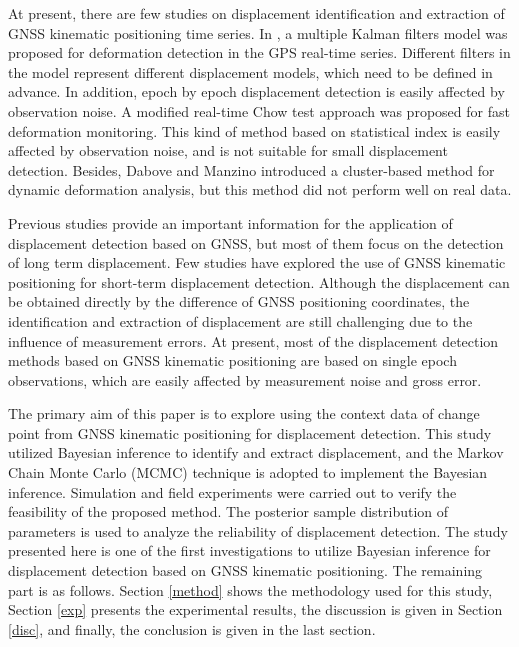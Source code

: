 \documentclass[final,3p,times]{elsarticle}
\begin{document}
	At present, there are few studies on displacement identification and extraction of GNSS kinematic positioning time series. In \cite{li2010deformation}, a multiple Kalman filters model was proposed for deformation detection in the GPS real-time series. Different filters in the model represent different displacement models, which need to be defined in advance. In addition, epoch by epoch displacement detection is easily affected by observation noise.
	A modified real-time Chow test approach was proposed for fast deformation monitoring\cite{bellone2016real}. This kind of method based on statistical index is easily affected by observation noise, and is not suitable for small displacement detection\cite{pirotti2015micro}. Besides, Dabove and Manzino\cite{dabove2016fast} introduced a cluster-based method for dynamic deformation analysis, but this method did not perform well on real data.
	
	Previous studies provide an important information for the application of displacement detection based on GNSS, but most of them focus on the detection of long term displacement. 
	Few studies have explored the use of GNSS kinematic positioning for short-term displacement detection. 
	Although the displacement can be obtained directly by the difference of GNSS positioning coordinates, the identification and extraction of displacement are still challenging due to the influence of measurement errors.
	At present, most of the displacement detection methods based on GNSS kinematic positioning are based on single epoch observations, which are easily affected by measurement noise and gross error.
	
	The primary aim of this paper is to explore using the context data of change point from GNSS kinematic positioning for displacement detection. 
	This study utilized Bayesian inference to identify and extract displacement, and the Markov Chain Monte Carlo (MCMC) technique is adopted to implement the Bayesian inference. 
	Simulation and field experiments were carried out to verify the feasibility of the proposed method. 
	The posterior sample distribution of parameters is used to analyze the reliability of displacement detection. 
	The study presented here is one of the first investigations to utilize Bayesian inference for displacement detection based on GNSS kinematic positioning. 
	The remaining part is as follows. Section \ref{method} shows the methodology used for this study, Section \ref{exp} presents the experimental results, the discussion is given in Section \ref{disc}, and finally, the conclusion is given in the last section.
	
\end{document}
